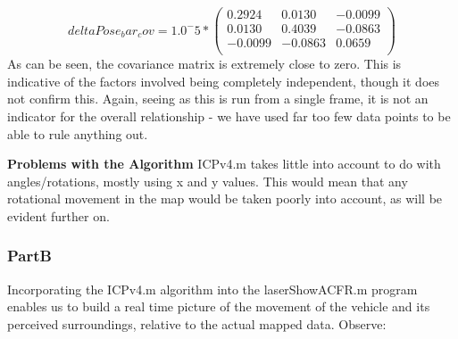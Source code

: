 		$$
		deltaPose_bar_cov = 1.0^-5 * 
		\begin{pmatrix}
		0.2924 & 0.0130 & -0.0099\\
		0.0130 & 0.4039 & -0.0863\\
		-0.0099  & -0.0863 & 0.0659\\
		\end{pmatrix}
		$$
		\newline
		As can be seen, the covariance matrix is extremely close to zero. This is indicative of the factors involved being completely independent, though it does not confirm this. Again, seeing as this is run from a single frame, it is not an indicator for the overall relationship - we have used far too few data points to be able to rule anything out.\newline \newline
		
		\textbf{Problems with the Algorithm}\newline
		ICPv4.m takes little into account to do with angles/rotations, mostly using x and y values. This would mean that any rotational movement in the map would be taken poorly into account, as will be evident further on.\newline \newline
				
			\pagebreak
		\subsubsection{PartB}
		\newline
		Incorporating the ICPv4.m algorithm into the laserShowACFR.m program enables us to build a real time picture of the movement of the vehicle and its perceived surroundings, relative to the actual mapped data. Observe:\newline \newline
		
